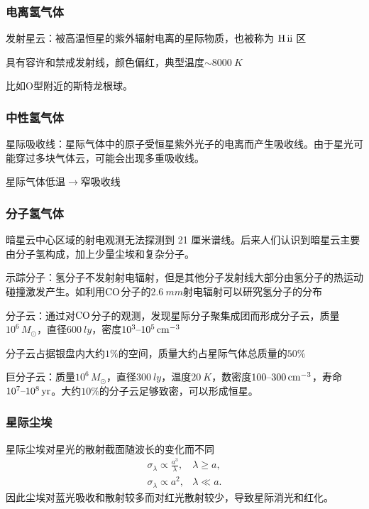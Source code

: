 \documentclass[../天体物理基础.tex]{subfiles}
\begin{document}
\subsubsection{电离氢气体}

发射星云：被高温恒星的紫外辐射电离的星际物质，也被称为 $\ce{H}\,\mathrm{\uppercase\expandafter{\romannumeral2}}$ 区

具有容许和禁戒发射线，颜色偏红，典型温度$\sim\qty{8000}{K}$

比如$\text{O}$型附近的斯特龙根球。

\subsubsection{中性氢气体}

星际吸收线：星际气体中的原子受恒星紫外光子的电离而产生吸收线。由于星光可能穿过多块气体云，可能会出现多重吸收线。

星际气体低温$\to$窄吸收线

\subsubsection{分子氢气体}

暗星云中心区域的射电观测无法探测到 21 厘米谱线。后来人们认识到暗星云主要由分子氢构成，加上少量尘埃和复杂分子。

示踪分子：氢分子不发射射电辐射，但是其他分子发射线大部分由氢分子的热运动碰撞激发产生。如利用$\ce{CO}$分子的$\qty{2.6}{mm}$射电辐射可以研究氢分子的分布

分子云：通过对$\ce{CO}$分子的观测，发现星际分子聚集成团而形成分子云，质量$10^{6}\,\unit{M_{\odot}}$，直径$\qty{600}{ly}$，密度$10^{3}\text{\textendash}10^{5}\,\unit{cm^{-3}}$

分子云占据银盘内大约$1\%$的空间，质量大约占星际气体总质量的$50\%$

巨分子云：质量$10^{6}\,\unit{M_{\odot}}$，直径$\qty{300}{ly}$，温度$\qty{20}{K}$，数密度$100\text{\textendash}300\,\unit{cm^{-3}}$，寿命$10^{7}\text{\textendash}10^{8}\,\unit{yr}$。大约$10\%$的分子云足够致密，可以形成恒星。

\subsubsection{星际尘埃}

星际尘埃对星光的散射截面随波长的变化而不同
\begin{align}
\sigma_{\lambda}\propto{}\frac{a^{3}}{\lambda},&\lambda\ge a,\\
\sigma_{\lambda}\propto{}a^{2},&\lambda\ll a.
\end{align}
因此尘埃对蓝光吸收和散射较多而对红光散射较少，导致星际消光和红化。
\end{document}
